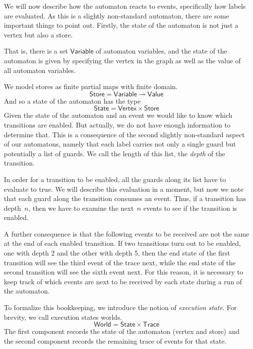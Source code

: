 \documentclass{sigplanconf} %
\newcommand{\pmap}{\rightharpoonup}
\newcommand{\set}[1]{\ensuremath{\mathsf{#1}}}
\theoremstyle{definition}
\theoremstyle{remark}
\begin{document}
We will now describe how the automaton reacts to events, specifically
how labels are evaluated. As this is a slightly non-standard
automaton, there are some important things to point out. Firstly, the
state of the automaton is not just a vertex but also a store. 

That is, there is a set $\set{Variable}$ of automaton variables, and the state of the automaton is
given by specifying the vertex in the graph as well as the value of
all automaton variables.

We model stores as finite partial maps with finite domain.
\[
\set{Store} = \set{Variable} \pmap \set{Value}
\]
And so a state of the automaton has the type
\[
\set{State} = \set{Vertex}\times\set{Store}
\]
Given the state of the automaton and an event we would like to know
which transitions are enabled. But actually, we do not have enough
information to determine that. This is a consequence of the second
slightly non-standard aspect of our automatons, namely that each label
carries not only a single guard but potentially a list of guards.
We call the length of this list, the \emph{depth} of the transition.

In order for a transition to be enabled, all the guards along its
list have to evaluate to true. We will describe this evaluation in a
moment, but now we note that each guard along the transition consumes
an event.
Thus, if a transition has depth~$n$, then we have to examine the next~$n$ events to see if the transition is enabled.

A further consequence is that the following events to be received are
not the same at the end of each enabled transition. If two transitions
turn out to be enabled, one with depth 2 and the other with depth 5,
then the end state of the first transition will see the third event of
the trace next, while the end state of the second transition will see
the sixth event next. For this reason, it is necessary to keep track
of which events are next to be received by each state during a run of
the automaton.

To formalize this bookkeeping, we introduce the notion of
\emph{execution state}. For brevity, we call execution states worlds.
\[
\set{World} = \set{State}\times\set{Trace}
\]
The first component records the state of the automaton (vertex
and store) and the second component records the remaining trace of
events for that state.
\end{document}
